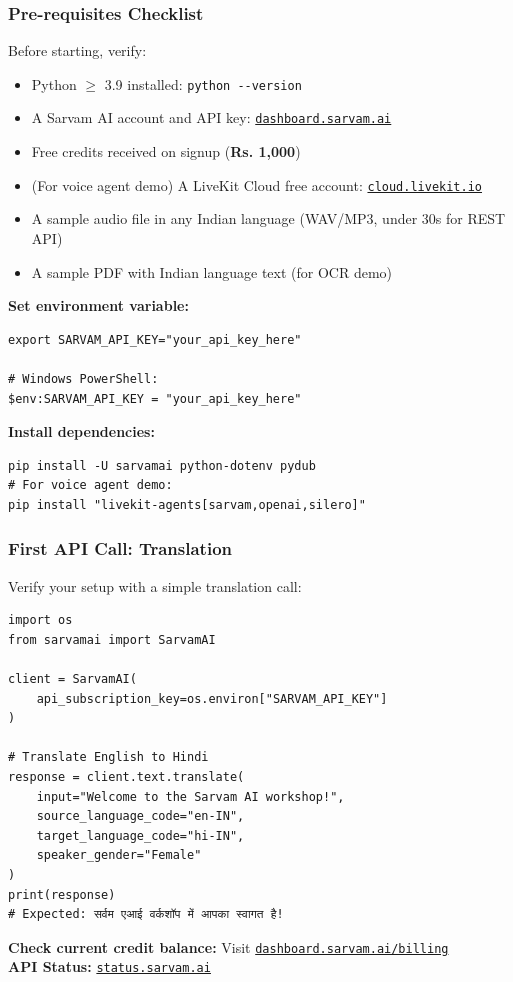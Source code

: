 \begin{frame}[fragile]\frametitle{Pre-requisites Checklist}
Before starting, verify:
  \begin{itemize}
    \item Python $\geq$ 3.9 installed: \lstinline|python --version|
    \item A Sarvam AI account and API key: \href{https://dashboard.sarvam.ai}{\texttt{dashboard.sarvam.ai}}
    \item Free credits received on signup (\textbf{Rs. 1,000})
    \item (For voice agent demo) A LiveKit Cloud free account: \href{https://cloud.livekit.io}{\texttt{cloud.livekit.io}}
    \item A sample audio file in any Indian language (WAV/MP3, under 30s for REST API)
    \item A sample PDF with Indian language text (for OCR demo)
  \end{itemize}

\textbf{Set environment variable:}
\begin{lstlisting}
export SARVAM_API_KEY="your_api_key_here"

# Windows PowerShell:
$env:SARVAM_API_KEY = "your_api_key_here"
\end{lstlisting}

\textbf{Install dependencies:}
\begin{lstlisting}
pip install -U sarvamai python-dotenv pydub
# For voice agent demo:
pip install "livekit-agents[sarvam,openai,silero]"
\end{lstlisting}
\end{frame}

\begin{frame}[fragile]\frametitle{First API Call: Translation}
Verify your setup with a simple translation call:
\begin{lstlisting}
import os
from sarvamai import SarvamAI

client = SarvamAI(
    api_subscription_key=os.environ["SARVAM_API_KEY"]
)

# Translate English to Hindi
response = client.text.translate(
    input="Welcome to the Sarvam AI workshop!",
    source_language_code="en-IN",
    target_language_code="hi-IN",
    speaker_gender="Female"
)
print(response)
# Expected: सर्वम एआई वर्कशॉप में आपका स्वागत है!
\end{lstlisting}

\textbf{Check current credit balance:} Visit \href{https://dashboard.sarvam.ai/billing}{\texttt{dashboard.sarvam.ai/billing}}\\
\textbf{API Status:} \href{https://status.sarvam.ai}{\texttt{status.sarvam.ai}}
\end{frame}


